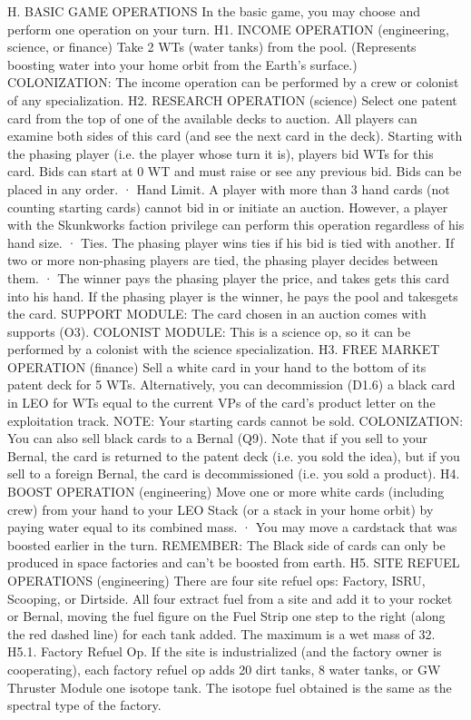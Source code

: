 \documentclass[a4paper]{book}
\begin{document}
H. BASIC GAME OPERATIONS
In the basic game, you may choose and perform one operation on your turn.
H1. INCOME OPERATION (engineering, science, or finance)
Take 2 WTs (water tanks) from the pool. (Represents boosting water into your home orbit from the Earth’s surface.)
COLONIZATION: The income operation can be performed by a crew or colonist of any specialization.
H2. RESEARCH OPERATION (science)
Select one patent card from the top of one of the available decks to auction. All players can examine both sides of this card (and see the next card in the deck). Starting with the phasing player (i.e. the player whose turn it is), players bid WTs for this card. Bids can start at 0 WT and must raise or see any previous bid. Bids can be placed in any order.
·    Hand Limit. A player with more than 3 hand cards (not counting starting cards) cannot bid in or initiate an auction. However, a player with the Skunkworks faction privilege can perform this operation regardless of his hand size.
·   Ties. The phasing player wins ties if his bid is tied with another. If two or more non-phasing players are tied, the phasing player decides between them.
·       The winner pays the phasing player the price, and takes gets this card into his hand. If the phasing player is the winner, he pays the pool and takesgets the card.
SUPPORT MODULE: The card chosen in an auction comes with supports (O3).
COLONIST MODULE: This is a science op, so it can be performed by a colonist with the science specialization.
H3. FREE MARKET OPERATION (finance)
Sell a white card in your hand to the bottom of its patent deck for 5 WTs. Alternatively, you can decommission (D1.6) a black card in LEO for WTs equal to the current VPs of the card’s product letter on the exploitation track.
NOTE: Your starting cards cannot be sold.
COLONIZATION: You can also sell black cards to a Bernal (Q9). Note that if you sell to your Bernal, the card is returned to the patent deck (i.e. you sold the idea), but if you sell to a foreign Bernal, the card is decommissioned (i.e. you sold a product).
H4. BOOST OPERATION (engineering)
Move one or more white cards (including crew) from your hand to your LEO Stack (or a stack in your home orbit) by paying water equal to its combined mass.
·       You may move a cardstack that was boosted earlier in the turn.
REMEMBER: The Black side of cards can only be produced in space factories and can’t be boosted from earth.
H5. SITE REFUEL OPERATIONS (engineering)
There are four site refuel ops: Factory, ISRU, Scooping, or Dirtside. All four extract fuel from a site and add it to your rocket or Bernal, moving the fuel figure on the Fuel Strip one step to the right (along the red dashed line) for each tank added. The maximum is a wet mass of 32.
H5.1. Factory Refuel Op. If the site is industrialized (and the factory owner is cooperating), each factory refuel op adds 20 dirt tanks, 8 water tanks, or {GW Thruster Module} one isotope tank. The isotope fuel obtained is the same as the spectral type of the factory.
\end{document}
